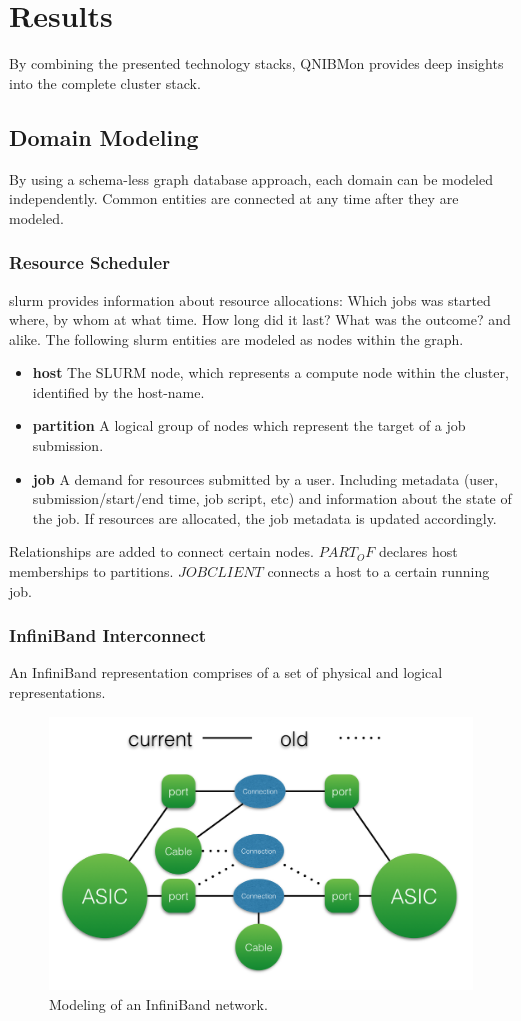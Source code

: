 \section{Results}
By combining the presented technology stacks, QNIBMon provides deep insights into the complete cluster stack.

\subsection{Domain Modeling}
By using a schema-less graph database approach, each domain can be modeled independently. Common entities are connected at any time after
they are modeled.

\subsubsection{Resource Scheduler}
\gls{slurm} provides information about resource allocations: Which jobs was started where, by whom at what time. How long did it last? What was the outcome? and alike.
The following \gls{slurm} entities are modeled as nodes within the graph.
\begin{itemize}
    \item \textbf{host} The SLURM node, which represents a compute node within the cluster, identified by the host-name.
    \item \textbf{partition} A logical group of nodes which represent the target of a job submission.
    \item \textbf{job} A demand for resources submitted by a user. Including metadata (user, submission/start/end time, job script, etc) and information about the state of the job. If resources are allocated, the job metadata is updated accordingly.
\end{itemize}
Relationships are added to connect certain nodes. $PART_OF$ declares host memberships to partitions. $JOBCLIENT$ connects a host to a certain running job.

\subsubsection{InfiniBand Interconnect}
An InfiniBand representation comprises of a set of physical and logical representations.
\begin{figure}[!ht]
    \includegraphics[width=.4\textwidth]{images/png/infiniband_graph.png}
    \caption{\label{fig:ib_graph}Modeling of an InfiniBand network.}
\end{figure}

